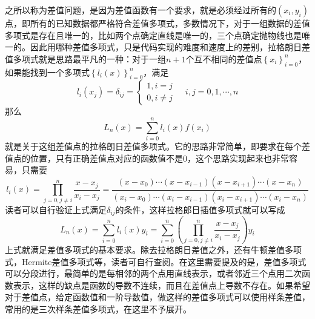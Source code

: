 \documentclass[12pt,a4paper,openany,twoside]{book}
\numberwithin{equation}{section}
\begin{document}
            之所以称为差值问题，是因为差值函数有一个要求，就是必须经过所有的$(x_i,y_i)$点，即所有的已知数据都严格符合差值多项式，多数情况下，对于一组数据的差值多项式是存在且唯一的，比如两个点确定直线是唯一的，三个点确定抛物线也是唯一的。因此用哪种差值多项式，只是代码实现的难度和速度上的差别，拉格朗日差值多项式就是思路最平凡的一种：对于一组$n+1$个互不相同的差值点$\left\{x_i\right\}_{i=0}^n$，如果能找到一个多项式$\left\{l_{i}(x)\right\}_{i=0}^{n}$，满足
            \begin{equation}
              l_{i}\left(x_{j}\right)=\delta_{i j}=\left\{\begin{array}{ll}
                {1, i=j} \\
                {0, i \neq j} 
              \end{array}\right.\ \ \ \ \ i, j=0,1, \cdots, n
            \end{equation}
            那么
            \begin{equation}
              L_{n}(x)=\sum_{i=0}^{n} l_{i}(x) f\left(x_{i}\right)
            \end{equation}
            就是关于这组差值点的拉格朗日差值多项式。它的思路非常简单，即要求在每个差值点的位置，只有正确差值点对应的函数值不是0，这个思路实现起来也非常容易，只需要
            \begin{equation}
              l_{i}(x)=\prod_{j=0, j \neq i}^{n} \frac{x-x_{j}}{x_{i}-x_{j}}=\frac{\left(x-x_{0}\right) \cdots\left(x-x_{i-1}\right)\left(x-x_{i+1}\right) \cdots\left(x-x_{n}\right)}{\left(x_{i}-x_{0}\right) \cdots\left(x_{i}-x_{i-1}\right)\left(x_{i}-x_{i+1}\right) \cdots\left(x_{i}-x_{n}\right)}
            \end{equation}
            读者可以自行验证上式满足$\delta_{ij}$的条件，这样拉格郎日插值多项式就可以写成
            \begin{equation}
              L_{n}(x)=\sum_{i=0}^{n} l_{i}(x) y_i=\sum_{i=0}^{n}\left(\prod_{j=0, j \neq i}^{n} \frac{x-x_{j}}{x_{i}-x_{j}}\right) y_i
            \end{equation}
            上式就满足差值多项式的基本要求。除去拉格朗日差值之外，还有牛顿差值多项式，Hermite差值多项式等，读者可自行查阅。在这里需要提及的是，差值多项式可以分段进行，最简单的是每相邻的两个点用直线表示，或者邻近三个点用二次函数表示，这样的缺点是函数的导数不连续，而且在差值点上导数不存在。如果希望对于差值点，给定函数值和一阶导数值，做这样的差值多项式可以使用样条差值，常用的是三次样条差值多项式，在这里不予展开。
\end{document}
